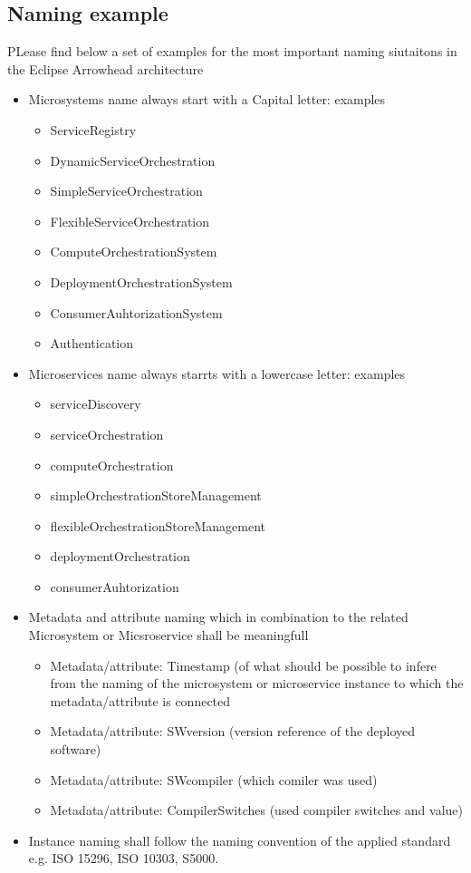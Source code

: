 \documentclass[a4paper]{arrowhead}
\begin{document}
\subsection{Naming example}
\label{sec:examples}

PLease find below a set of examples for the most important naming
siutaitons in the Eclipse Arrowhead architecture
\begin{itemize}
\item Microsystems name always start with a Capital letter: examples
  \begin{itemize}
  \item ServiceRegistry
  \item DynamicServiceOrchestration
  \item SimpleServiceOrchestration
  \item FlexibleServiceOrchestration

  \item ComputeOrchestrationSystem
  \item DeploymentOrchestrationSystem
  \item ConsumerAuhtorizationSystem
  \item Authentication
  \end{itemize}
  
\item Microservices name always starrts with a lowercase letter: examples 
  \begin{itemize}
  \item serviceDiscovery
  \item serviceOrchestration
  \item computeOrchestration
  \item simpleOrchestrationStoreManagement
  \item flexibleOrchestrationStoreManagement
  \item deploymentOrchestration
  \item consumerAuhtorization
  \end{itemize}

\item Metadata and attribute naming which in combination to the
  related Microsystem or Micsroservice shall be meaningfull
  \begin{itemize}
  \item Metadata/attribute: Timestamp (of what should be possible to infere from
    the naming of the microsystem or microservice instance to which the
    metadata/attribute is connected
  \item Metadata/attribute: SWversion (version reference of the
    deployed software)
  \item Metadata/attribute: SWcompiler (which comiler was used)
  \item Metadata/attribute: CompilerSwitches (used compiler switches
    and value) 
  \end{itemize}

\item Instance naming shall follow the naming convention of the
    applied standard e.g. ISO 15296, ISO 10303, S5000. 

\end{itemize} 
\end{document}
